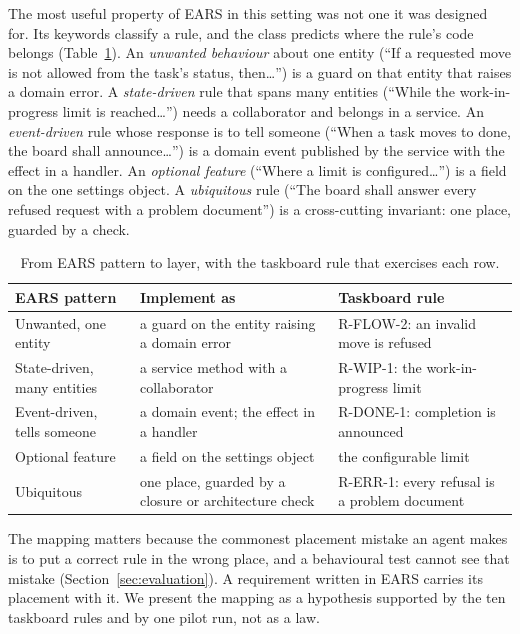The most useful property of EARS in this setting was not one it was designed for. Its keywords
classify a rule, and the class predicts where the rule's code belongs (Table~\ref{tab:ears}).
An \emph{unwanted behaviour} about one entity (``If a requested move is not allowed from the
task's status, then\ldots'') is a guard on that entity that raises a domain error. A
\emph{state-driven} rule that spans many entities (``While the work-in-progress limit is
reached\ldots'') needs a collaborator and belongs in a service. An \emph{event-driven} rule whose
response is to tell someone (``When a task moves to done, the board shall announce\ldots'')
is a domain event published by the service with the effect in a handler. An \emph{optional
feature} (``Where a limit is configured\ldots'') is a field on the one settings object. A
\emph{ubiquitous} rule (``The board shall answer every refused request with a problem
document'') is a cross-cutting invariant: one place, guarded by a check.

\begin{table}[t]
  \centering\small
  \caption{From EARS pattern to layer, with the taskboard rule that exercises each row.}
  \label{tab:ears}
  \begin{tabularx}{\linewidth}{l|X|X}
    \hline
    \textbf{EARS pattern} & \textbf{Implement as} & \textbf{Taskboard rule} \\
    \hline\hline
    Unwanted, one entity & a guard on the entity raising a domain error & R-FLOW-2: an invalid move is refused \\
    \hline
    State-driven, many entities & a service method with a collaborator & R-WIP-1: the work-in-progress limit \\
    \hline
    Event-driven, tells someone & a domain event; the effect in a handler & R-DONE-1: completion is announced \\
    \hline
    Optional feature & a field on the settings object & the configurable limit \\
    \hline
    Ubiquitous & one place, guarded by a closure or architecture check & R-ERR-1: every refusal is a problem document \\
    \hline
  \end{tabularx}
\end{table}

The mapping matters because the commonest placement mistake an agent makes is to put a correct
rule in the wrong place, and a behavioural test cannot see that mistake (Section~\ref{sec:evaluation}).
A requirement written in EARS carries its placement with it. We present the mapping as a
hypothesis supported by the ten taskboard rules and by one pilot run, not as a law.

